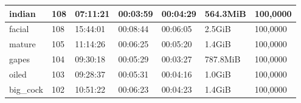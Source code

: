 \begin{table}[]
\begin{tabular}{l|l|l|l|l|l|l}
indian                                             & 108                                                 & 07:11:21                                                 & 00:03:59                                                & 00:04:29                                               & 564.3MiB                                             & 100,0000                                                      \\ \hline
facial                                             & 108                                                 & 15:44:01                                                 & 00:08:44                                                & 00:06:05                                               & 2.5GiB                                               & 100,0000                                                      \\ \hline
mature                                             & 105                                                 & 11:14:26                                                 & 00:06:25                                                & 00:05:20                                               & 1.4GiB                                               & 100,0000                                                      \\ \hline
gapes                                              & 104                                                 & 09:30:18                                                 & 00:05:29                                                & 00:03:27                                               & 787.8MiB                                             & 100,0000                                                      \\ \hline
oiled                                              & 103                                                 & 09:28:37                                                 & 00:05:31                                                & 00:04:16                                               & 1.0GiB                                               & 100,0000                                                      \\ \hline
big\_cock                                          & 102                                                 & 10:51:22                                                 & 00:06:23                                                & 00:04:23                                               & 1.4GiB                                               & 100,0000                                                      \\ \hline

\end{tabular}
\end{table}
